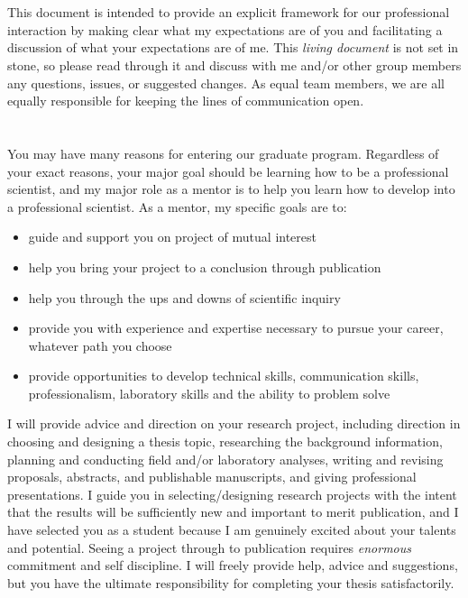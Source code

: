 \documentclass[11pt]{article}
\newcommand{\p}[1]{\vspace{1em} \noindent{\textbf{\textsc{#1~~}}}}
\begin{document}
\section*{} %
\vspace{-2em}
\p{Summary} This document is intended to provide an explicit framework for our professional interaction by making clear what my expectations are of you and facilitating a discussion of what your expectations are of me. This \emph{living document} is not set in stone, so please read through it and discuss with me and/or other group members any questions, issues, or suggested changes. As equal team members, we are all equally responsible for keeping the lines of communication open.

\section*{} %
\vspace{-4em}
\p{Goals} You may have many reasons for entering our graduate program. Regardless of your exact reasons, your major goal should be learning how to be a professional scientist, and my major role as a mentor is to help you learn how to develop into a professional scientist. As a mentor, my specific goals are to:
\begin{itemize}
	\itemsep0em
\item guide and support you on project of mutual interest
\item help you bring your project to a conclusion through publication
\item help you through the ups and downs of scientific inquiry
\item provide you with experience and expertise necessary to pursue your career, whatever path you choose
\item provide opportunities to develop technical skills, communication skills, professionalism, laboratory skills and the ability to problem solve
\end{itemize}
I will provide advice and direction on your research project, including direction in choosing and designing a thesis topic, researching the background information, planning and conducting field and/or laboratory analyses, writing and revising proposals, abstracts, and publishable manuscripts, and giving professional presentations.
I guide you in selecting/designing research projects with the intent that the results will be sufficiently new and important to merit publication, and I have selected you as a student because I am genuinely excited about your talents and potential.
Seeing a project through to publication requires \emph{enormous} commitment and self discipline.
I will freely provide help, advice and suggestions, but you have the ultimate responsibility for completing your thesis satisfactorily.
\end{document}
